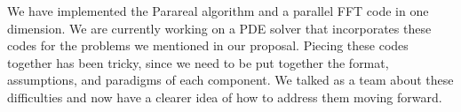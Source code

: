 \begin{questions}

\begin{solution}
 	We have implemented the Parareal algorithm and a parallel FFT
 	code in one dimension. We are currently working on a PDE solver
 	that incorporates these codes for the problems we mentioned
 	in our proposal. Piecing these codes together has been tricky,
 	since we need to be put together the format, assumptions, and
 	paradigms of each component. We talked as a team about
 	these difficulties and now have a clearer idea of how to
 	address them moving forward.
\end{solution}

\end{questions}